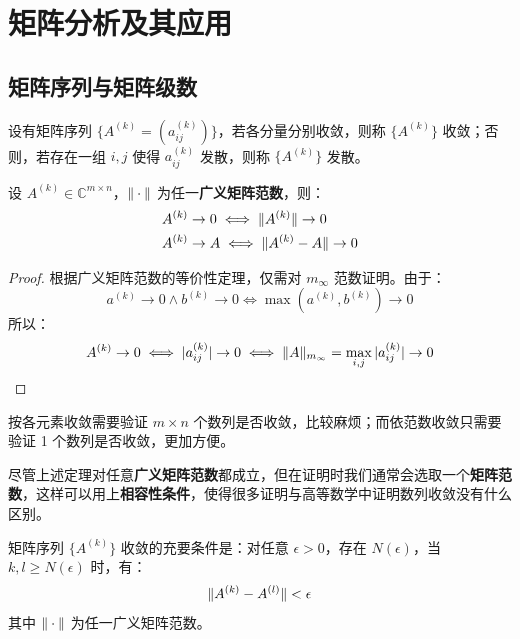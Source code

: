 \section{矩阵分析及其应用}

\subsection{矩阵序列与矩阵级数}

\begin{definition}[矩阵序列的收敛]
设有矩阵序列 $\{A^{(k)}=(a_{ij}^{(k)})\}$，若各分量分别收敛，则称 $\{A^{(k)}\}$ 收敛；否则，若存在一组 $i,j$ 使得 $a_{ij}^{(k)}$ 发散，则称 $\{A^{(k)}\}$ 发散。
\end{definition}

\begin{theorem}[各分量收敛等价于依范数收敛]
设 $A^{(k)}\in\mathbb C^{m\times n}$，$\Vert\cdot\Vert$ 为任一\textbf{广义矩阵范数}，则：
\begin{align*}
    &A^{(k)}\to 0\iff \Vert A^{(k)}\Vert\to 0\\
    &A^{(k)}\to A\iff \Vert A^{(k)}-A\Vert\to 0
\end{align*}
\end{theorem}
\begin{proof}
根据广义矩阵范数的等价性定理，仅需对 $m_\infty$ 范数证明。由于：
\[
    a^{(k)}\to 0\wedge b^{(k)}\to 0\iff\max(a^{(k)},b^{(k)})\to0
\]
所以：
\[
    A^{(k)}\to 0\iff |a_{ij}^{(k)}|\to 0\iff\Vert A\Vert_{m_\infty}=\max_{i,j}|a_{ij}^{(k)}|\to 0
\]
\end{proof}

\begin{remark}
按各元素收敛需要验证 $m\times n$ 个数列是否收敛，比较麻烦；而依范数收敛只需要验证 1 个数列是否收敛，更加方便。
\end{remark}

\begin{remark}
尽管上述定理对任意\textbf{广义矩阵范数}都成立，但在证明时我们通常会选取一个\textbf{矩阵范数}，这样可以用上\textbf{相容性条件}，使得很多证明与高等数学中证明数列收敛没有什么区别。
\end{remark}

\begin{definition}[Cauchy 收敛]
矩阵序列 $\{A^{(k)}\}$ 收敛的充要条件是：对任意 $\epsilon>0$，存在 $N(\epsilon)$，当 $k,l\geq N(\epsilon)$ 时，有：
\[
    \Vert A^{(k)}-A^{(l)}\Vert<\epsilon
\]
其中 $\Vert\cdot\Vert$ 为任一广义矩阵范数。
\end{definition}

